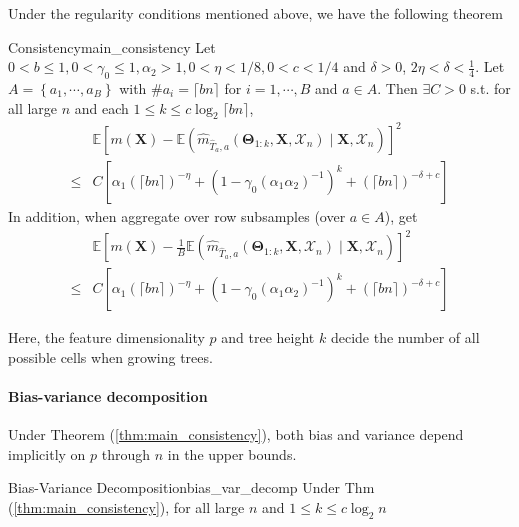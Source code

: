\documentclass[twoside]{article}
\begin{document}
Under the regularity conditions mentioned above, we have the following theorem
\begin{theorem}{Consistency}{main_consistency}
    Let $0<b\leq 1,0<\gamma_0\leq 1,\alpha_2 >1,0<\eta<1/8,0<c<1/4$ and $\delta>0$, $2\eta < \delta <\frac{1}{4}$. Let $A=\left\{ a_1,\cdots,a_B \right\}$ with $\# a_i = \lceil bn \rceil $ for $i=1,\cdots,B$ and $a\in A$. Then $\exists C>0$ s.t. for all large $n$ and each $1\leq k \leq c \log_2\lceil bn \rceil$, 
    \begin{align*}
        &\mathbb{E}\left[ m(\mathbf{X}) - \mathbb{E}\left(\hat{m}_{\hat{T}_a,a} \left(\boldsymbol{\Theta}_{1:k},\mathbf{X},\mathcal{X}_n\right)\mid \mathbf{X},\mathcal{X}_n\right) \right]^2\\
        \leq & C\left[ \alpha_1 \left(\lceil bn \rceil\right)^{-\eta} + \left(1-\gamma_0 \left(\alpha_1\alpha_2\right)^{-1}\right)^k + \left(\lceil bn \rceil\right)^{-\delta+c} \right]
    \end{align*} 
    In addition, when aggregate over row subsamples (over $a\in A$), get 
    \begin{align*}
        &\mathbb{E}\left[ m(\mathbf{X}) - \frac{1}{B}\mathbb{E}\left(\hat{m}_{\hat{T}_a,a} \left(\boldsymbol{\Theta}_{1:k},\mathbf{X},\mathcal{X}_n\right)\mid \mathbf{X},\mathcal{X}_n\right) \right]^2\\
        \leq & C\left[ \alpha_1 \left(\lceil bn \rceil\right)^{-\eta} + \left(1-\gamma_0 \left(\alpha_1\alpha_2\right)^{-1}\right)^k + \left(\lceil bn \rceil\right)^{-\delta+c} \right]
    \end{align*}
\end{theorem}
Here, the feature dimensionality $p$ and tree height $k$ decide the number of all possible cells when growing trees. 

\paragraph*{Bias-variance decomposition}
Under Theorem (\ref{thm:main_consistency}), both bias and variance depend implicitly on $p$ through $n$ in the upper bounds.
\begin{proposition}{Bias-Variance Decomposition}{bias_var_decomp}
    Under Thm (\ref{thm:main_consistency}), for all large $n$ and $1\leq k\leq c\log _2 n$
\end{proposition}

\newpage


\end{document}
